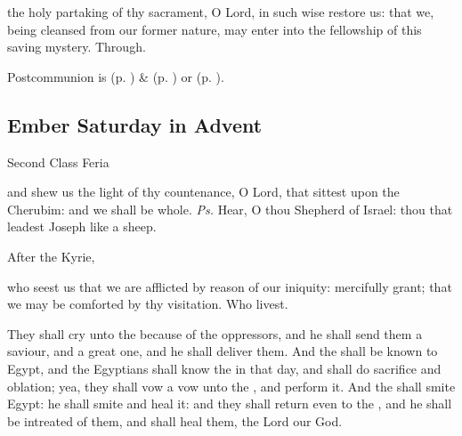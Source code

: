 
\postcommunion
{} the holy partaking of thy sacrament, O Lord, in such wise restore us: that we, being cleansed from our former nature, may enter into the fellowship of this saving mystery. Through.
\begin{rubric}
     Postcommunion is  (p. \pageref{SPMaryInAdvent}) \&   (p. \pageref{SPAgainst}) or  (p. \pageref{SPChiefBishop}).
\end{rubric}


\subsection{Ember Saturday in Advent}
\begin{inhead}
{Second Class Feria}
\end{inhead}

\introit
{} and shew us the light of thy countenance, O Lord, that sittest upon the Cherubim: and we shall be whole. \textit{Ps.} Hear, O thou Shepherd of Israel: thou that leadest Joseph like a sheep.

\clearpage

\begin{rubric}
    After the Kyrie,
\end{rubric}

\collect
{} who seest us that we are afflicted by reason of our iniquity: mercifully grant; that we may be comforted by thy visitation. Who livest.

 They shall cry unto the  because of the oppressors, and he shall send them a saviour, and a great one, and he shall deliver them. And the  shall be known to Egypt, and the Egyptians shall know the  in that day, and shall do sacrifice and oblation; yea, they shall vow a vow unto the , and perform it. And the  shall smite Egypt: he shall smite and heal it: and they shall return even to the , and he shall be intreated of them, and shall heal them, the Lord our God.


